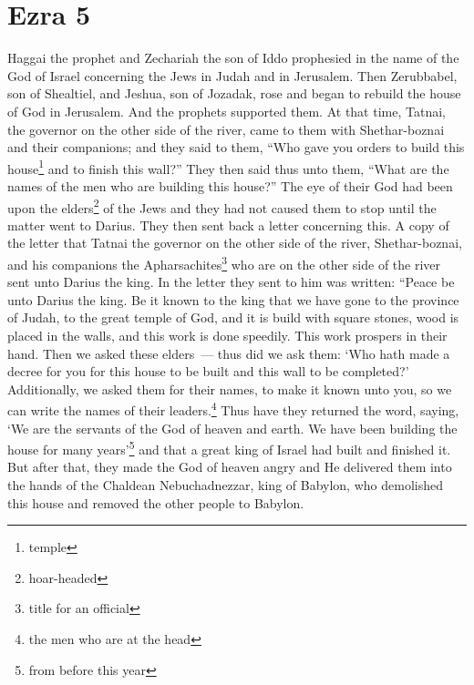 \section{Ezra 5}\label{Ezra 5}
\begin{enumerate}
     Haggai the prophet and Zechariah the son of Iddo prophesied in the name of the God of Israel concerning the Jews in Judah and in Jerusalem.%
     Then Zerubbabel, son of Shealtiel, and Jeshua, son of Jozadak, rose and began to rebuild the house of God in Jerusalem. And the prophets supported them.%
     At that time, Tatnai, the governor on the other side of the river, came to them with Shethar-boznai and their companions; and they said to them, ``Who gave you orders to build this house\footnote{temple} and to finish this wall?''%
     They then said thus unto them, ``What are the names of the men who are building this house?''%
     The eye of their God had been upon the elders\footnote{hoar-headed} of the Jews and they had not caused them to stop until the matter went to Darius. They then sent back a letter concerning this.%
     A copy of the letter that Tatnai the governor on the other side of the river, Shethar-boznai, and his companions the Apharsachites\footnote{title for an official} who are on the other side of the river sent unto Darius the king.%
     In the letter they sent to him was written: ``Peace be unto Darius the king.%
     Be it known to the king that we have gone to the province of Judah, to the great temple of God, and it is build with square stones, wood is placed in the walls, and this work is done speedily. This work prospers in their hand.%
     Then we asked these elders~--- thus did we ask them: `Who hath made a decree for you for this house to be built and this wall to be completed?'%
     Additionally, we asked them for their names, to make it known unto you, so we can write the names of their leaders.\footnote{the men who are at the head}%
     Thus have they returned the word, saying, `We are the servants of the God of heaven and earth. We have been building the house for many years'\footnote{from before this year} and that a great king of Israel had built and finished it.%
     But after that, they made the God of heaven angry and He delivered them into the hands of the Chaldean Nebuchadnezzar, king of Babylon, who demolished this house and removed the other people to Babylon.%

\end{enumerate}
